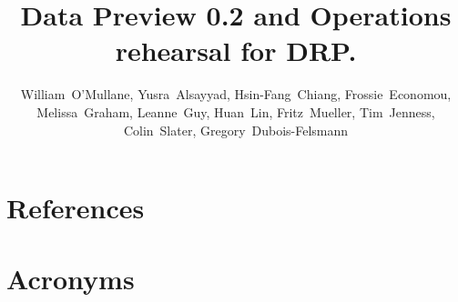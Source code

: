 \documentclass[OPS,lsstdraft,authoryear,toc]{lsstdoc}
\title{Data Preview 0.2 and Operations rehearsal for DRP.}
\author{%
William~O'Mullane,
Yusra~Alsayyad,
Hsin-Fang~Chiang,
Frossie~Economou,
Melissa~Graham,
Leanne~Guy,
Huan~Lin,
Fritz~Mueller,
Tim~Jenness,
Colin~Slater,
Gregory~Dubois-Felsmann
}
\date{\vcsDate}
\begin{document}
\maketitle


\appendix
\section{References} \label{sec:bib}
\renewcommand{\refname}{} %


\section{Acronyms} \label{sec:acronyms}

\end{document}
